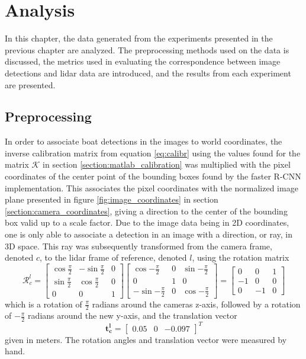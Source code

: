 
\chapter{Analysis}
In this chapter, the data generated from the experiments presented in the previous chapter are analyzed. The preprocessing methods used on the data is discussed, the metrics used in evaluating the correspondence between image detections and lidar data are introduced, and the results from each experiment are presented.
\section{Preprocessing}
In order to associate boat detections in the images to world coordinates, the inverse calibration matrix from equation \ref{eq:calibr} using the values found for the matrix $\mathcal{K}$ in section \ref{section:matlab_calibration} was multiplied with the pixel coordinates of the center point of the bounding boxes found by the faster R-CNN implementation. This associates the pixel coordinates with the normalized image plane presented in figure \ref{fig:image_coordinates} in section \ref{section:camera_coordinates}, giving a direction to the center of the bounding box valid up to a scale factor. Due to the image data being in 2D coordinates, one is only able to associate a detection in an image with a direction, or ray, in 3D space. This ray was subsequently transformed from the camera frame, denoted $c$, to the lidar frame of reference, denoted $l$, using the rotation matrix
\begin{equation}
\mathcal{R}_c^l=\begin{bmatrix}
\cos{\frac{\pi}{2}} & -\sin{\frac{\pi}{2}} & 0 \\
\sin{\frac{\pi}{2}} & \cos{\frac{\pi}{2}} & 0 \\
0 & 0 & 1
\end{bmatrix}\begin{bmatrix}
\cos{-\frac{\pi}{2}} & 0 & \sin{-\frac{\pi}{2}}\\
0 & 1 & 0 \\
-\sin{-\frac{\pi}{2}} & 0 & \cos{-\frac{\pi}{2}}
\end{bmatrix}=\begin{bmatrix}
0 & 0 & 1\\
-1 & 0 & 0\\
0 & -1 & 0
\end{bmatrix}
\end{equation}
which is a rotation of $\frac{\pi}{2}$ radians around the cameras z-axis, followed by a rotation of $-\frac{\pi}{2}$ radians around the new y-axis, and the translation vector
\begin{equation}
\mathbf{t_c^l}=\begin{bmatrix}
0.05 & 0 & -0.097
\end{bmatrix}^T
\end{equation} 
given in meters. The rotation angles and translation vector were measured by hand.

